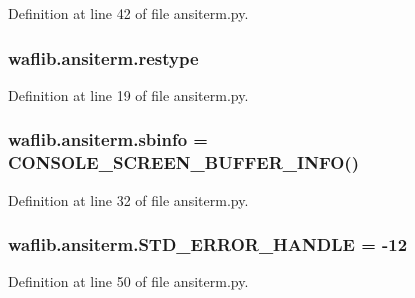 Definition at line 42 of file ansiterm.\+py.

\subsubsection[{\texorpdfstring{restype}{restype}}]{\setlength{\rightskip}{0pt plus 5cm}waflib.\+ansiterm.\+restype}\hypertarget{namespacewaflib_1_1ansiterm_a05fad996d2ba1e2a96d57bd1c7c9e68a}{}\label{namespacewaflib_1_1ansiterm_a05fad996d2ba1e2a96d57bd1c7c9e68a}


Definition at line 19 of file ansiterm.\+py.

\subsubsection[{\texorpdfstring{sbinfo}{sbinfo}}]{\setlength{\rightskip}{0pt plus 5cm}waflib.\+ansiterm.\+sbinfo = {\bf C\+O\+N\+S\+O\+L\+E\+\_\+\+S\+C\+R\+E\+E\+N\+\_\+\+B\+U\+F\+F\+E\+R\+\_\+\+I\+N\+FO}()}\hypertarget{namespacewaflib_1_1ansiterm_ad610af241e734e13a1e32457721b778b}{}\label{namespacewaflib_1_1ansiterm_ad610af241e734e13a1e32457721b778b}


Definition at line 32 of file ansiterm.\+py.

\subsubsection[{\texorpdfstring{S\+T\+D\+\_\+\+E\+R\+R\+O\+R\+\_\+\+H\+A\+N\+D\+LE}{STD_ERROR_HANDLE}}]{ waflib.\+ansiterm.\+S\+T\+D\+\_\+\+E\+R\+R\+O\+R\+\_\+\+H\+A\+N\+D\+LE = -\/12}\hypertarget{namespacewaflib_1_1ansiterm_a8e9bd079147f6c23617a79cb6313e555}{}\label{namespacewaflib_1_1ansiterm_a8e9bd079147f6c23617a79cb6313e555}


Definition at line 50 of file ansiterm.\+py.


